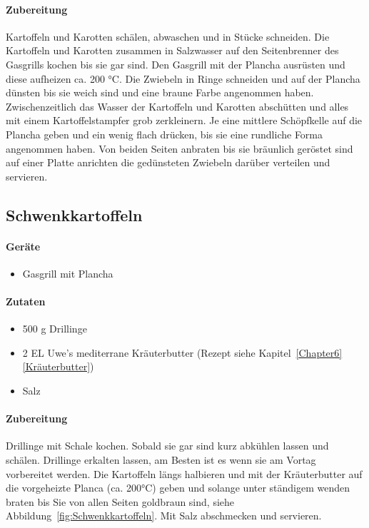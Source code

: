 \paragraph{Zubereitung}

Kartoffeln und Karotten schälen, abwaschen und in Stücke schneiden. Die Kartoffeln und Karotten zusammen in Salzwasser auf den Seitenbrenner des Gasgrills kochen bis sie gar sind.  Den Gasgrill mit der Plancha ausrüsten und diese aufheizen ca. 200 °C. Die Zwiebeln in Ringe schneiden und auf der Plancha dünsten bis sie weich sind und eine braune Farbe angenommen haben. Zwischenzeitlich das Wasser der Kartoffeln und Karotten abschütten und alles mit einem Kartoffelstampfer grob zerkleinern. Je eine mittlere Schöpfkelle auf die Plancha geben und ein wenig flach drücken, bis sie eine rundliche Forma angenommen haben. Von beiden Seiten anbraten bis sie bräunlich geröstet sind auf einer Platte anrichten die gedünsteten Zwiebeln darüber verteilen und servieren.

\subsection{Schwenkkartoffeln}

\paragraph{Geräte}

\begin{itemize}
	\item Gasgrill mit Plancha
\end{itemize}

\paragraph{Zutaten}

\begin{itemize}[noitemsep]
	\item 500 g Drillinge
	\item 2 EL Uwe's mediterrane Kräuterbutter (Rezept siehe 
	Kapitel~\ref{Chapter6} \vref{Kräuterbutter})
	\item Salz
\end{itemize}

\paragraph{Zubereitung}

Drillinge mit Schale kochen. Sobald sie gar sind kurz abkühlen lassen und schälen. Drillinge erkalten lassen, am Besten ist es wenn sie am Vortag vorbereitet werden. Die Kartoffeln längs halbieren und mit der Kräuterbutter auf die vorgeheizte Planca (ca. 200°C) geben und solange unter ständigem wenden braten bis Sie von allen Seiten goldbraun sind, siehe Abbildung~\vref{fig:Schwenkkartoffeln}. Mit Salz abschmecken und servieren. 
\newpage

